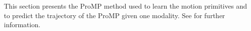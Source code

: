 \documentclass[runningheads,a4paper]{llncs}
\begin{document}
This section presents the ProMP method used to learn the motion primitives and to predict the trajectory of the ProMP given one modality. See \cite{oriane2017} for further information.

%
%
%
%
%
\end{document}
